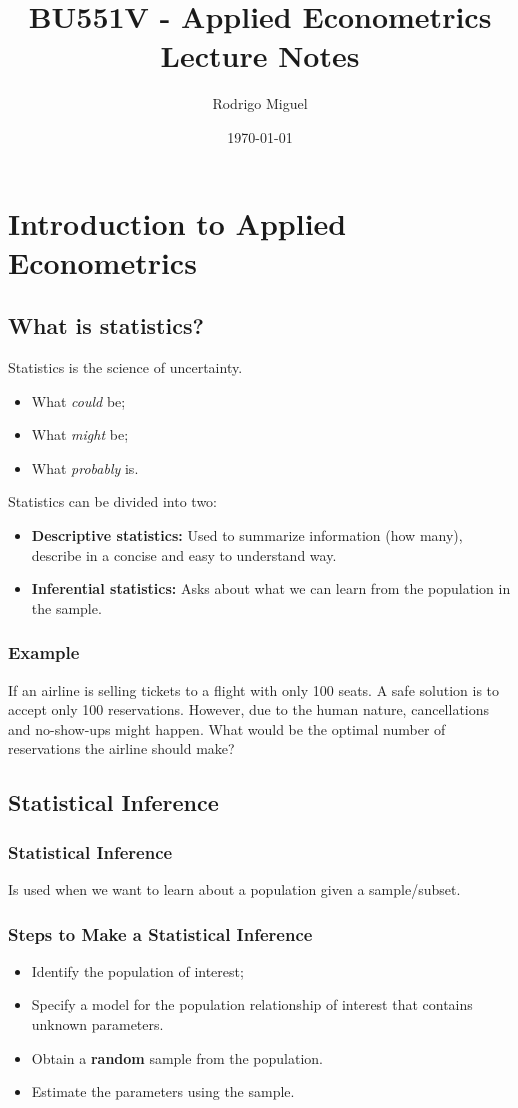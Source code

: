 \documentclass[11pt,a4paper]{report}
\title{BU551V - Applied Econometrics \\ Lecture Notes}
\author{Rodrigo Miguel}
\date{\today}
\begin{document}
\maketitle
\tableofcontents

\chapter{Introduction to Applied Econometrics}
\section{What is statistics?}
Statistics is the science of uncertainty.
\begin{itemize}
    \item What \textit{could} be;
    \item What \textit{might} be;
    \item What \textit{probably} is.
\end{itemize}
Statistics can be divided into two:
\begin{itemize}
    \item \textbf{Descriptive statistics:} Used to summarize information (how many), describe in a concise and easy to understand way.
    \item \textbf{Inferential statistics:} Asks about what we can learn from the population in the sample.
\end{itemize}
\subsection{Example}
If an airline is selling tickets to a flight with only 100 seats. A safe solution is to accept only 100 reservations. However, due to the human nature, cancellations and no-show-ups might happen. What would be the optimal number of reservations the airline should make?

\section{Statistical Inference}
\subsection{Statistical Inference}
Is used when we want to learn about a population given a sample/subset.
\subsection{Steps to Make a Statistical Inference}
\begin{itemize}
    \item Identify the population of interest;
    \item Specify a model for the population relationship of interest that contains unknown parameters.
    \item Obtain a \textbf{random} sample from the population.
    \item Estimate the parameters using the sample.
\end{itemize}
\end{document}
